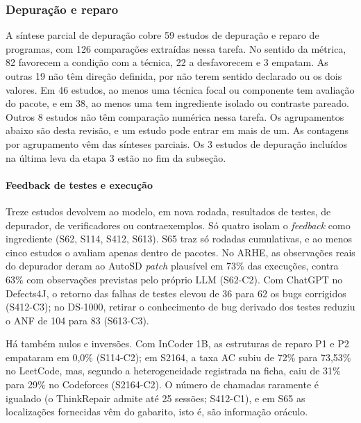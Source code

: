 \subsubsection{Depuração e reparo}

A síntese parcial de depuração cobre 59 estudos de depuração e reparo de programas, com 126 comparações extraídas nessa tarefa. No
sentido da métrica, 82 favorecem a condição com a técnica, 22 a desfavorecem e 3 empatam. As outras 19 não têm
direção definida, por não terem sentido declarado ou os dois valores. Em 46 estudos, ao menos uma técnica focal ou
componente tem avaliação do pacote, e em 38, ao menos uma tem ingrediente isolado ou contraste pareado. Outros 8 estudos não têm
comparação numérica nessa tarefa. Os agrupamentos abaixo são desta revisão, e um estudo pode entrar em mais de um.
As contagens por agrupamento vêm das sínteses parciais. Os 3 estudos de depuração incluídos na última leva da
etapa 3 estão no fim da subseção.

\paragraph{Feedback de testes e execução}
Treze estudos devolvem ao modelo, em nova rodada, resultados de testes, de depurador, de verificadores ou contraexemplos. Só quatro isolam o \textit{feedback} como ingrediente (S62, S114, S412, S613). S65 traz só rodadas cumulativas, e ao menos cinco estudos o avaliam apenas dentro de pacotes.
No ARHE, as observações reais do depurador deram ao AutoSD \textit{patch} plausível em 73\% das execuções, contra 63\% com observações previstas pelo próprio LLM (S62-C2).
Com ChatGPT no Defects4J, o retorno das falhas de testes elevou de 36 para 62 os bugs corrigidos (S412-C3); no DS-1000, retirar o conhecimento de bug derivado dos testes reduziu o ANF de 104 para 83 (S613-C3).

Há também nulos e inversões.
Com InCoder 1B, as estruturas de reparo P1 e P2 empataram em 0,0\% (S114-C2); em S2164, a taxa AC subiu de 72\% para 73,53\% no LeetCode, mas, segundo a heterogeneidade registrada na ficha, caiu de 31\% para 29\% no Codeforces (S2164-C2).
O número de chamadas raramente é igualado (o ThinkRepair admite até 25 sessões; S412-C1), e em S65 as localizações fornecidas vêm do gabarito, isto é, são informação oráculo.

